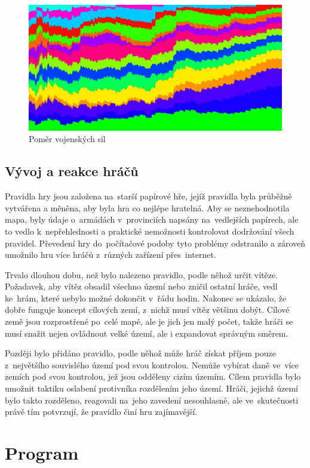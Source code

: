 \documentclass[a4paper,12pt]{article}
\begin{document}
\begin{figure}[H]
	\includegraphics[width=\textwidth]{LayerGraph.png}
	\caption{Poměr vojenských sil}
	\label{graph3}
\end{figure}

\subsection{Vývoj a reakce hráčů}
Pravidla hry jsou založena na~starší papírové hře, jejíž pravidla byla průběžně vytvářena a měněna, aby byla hra co nejlépe hratelná. Aby se neznehodnotila mapa, byly údaje o~armádách v~provinciích napsány na~vedlejších papírech, ale to vedlo k~nepřehlednosti a praktické nemožnosti kontrolovat dodržování všech pravidel. Převedení hry do~počítačové podoby tyto problémy odstranilo a zároveň umožnilo hru více hráčů z~různých zařízení přes~internet.

Trvalo dlouhou dobu, než bylo nalezeno pravidlo, podle něhož určit vítěze. Požadavek, aby vítěz obsadil všechno území nebo zničil ostatní hráče, vedl ke~hrám, které nebylo možné dokončit v~řádu hodin. Nakonec se ukázalo, že dobře funguje koncept cílových zemí, z~nichž musí vítěz většinu dobýt. Cílové země jsou rozprostřené po~celé mapě, ale je jich jen malý počet, takže hráči se musí snažit nejen ovládnout velké území, ale i expandovat správným směrem.

Později bylo přidáno pravidlo, podle něhož může hráč získat příjem pouze z~největšího souvislého území pod svou kontrolou. Nemůže vybírat daně ve~více zemích pod svou kontrolou, jež jsou odděleny cizím územím. Cílem pravidla bylo umožnit taktiku oslabení protivníka rozdělením jeho území. Hráči, jejichž území bylo takto rozděleno, reagovali na~jeho zavedení nesouhlasně, ale ve~skutečnosti právě tím potvrzují, že pravidlo činí hru zajímavější.

\section{Program}
\end{document}
